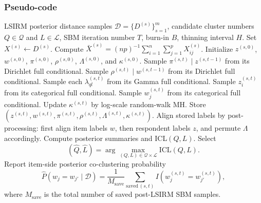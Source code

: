 \documentclass[A4paper,11pt]{article}
\begin{document}
\subsubsection{Pseudo-code}

\begin{algorithm}[H]
\caption{Post-LSIRM bipartite SBM using posterior distance samples}
\begin{algorithmic}[1]
\Require LSIRM posterior distance samples $\mathcal{D}=\{D^{(s)}\}_{s=1}^m$,
candidate cluster numbers $Q \in \mathcal{Q}$ and $L \in \mathcal{L}$,
SBM iteration number $T$, burn-in $B$, thinning interval $H$.
        \State Set $X^{(s)} \leftarrow D^{(s)}$.
        \State Compute $\bar X^{(s)} = (np)^{-1}\sum_{i=1}^n\sum_{j=1}^p X^{(s)}_{ij}$.
        \State Initialize $z^{(s,0)}$, $w^{(s,0)}$, $\pi^{(s,0)}$, $\rho^{(s,0)}$,
        $\Lambda^{(s,0)}$, and $\kappa^{(s,0)}$.
            \State Sample $\pi^{(s,t)} \mid z^{(s,t-1)}$ from its Dirichlet full conditional.
            \State Sample $\rho^{(s,t)} \mid w^{(s,t-1)}$ from its Dirichlet full conditional.
            \State Sample each $\lambda_{ql}^{(s,t)}$ from its Gamma full conditional.
                \State Sample $z_i^{(s,t)}$ from its categorical full conditional.
            \EndFor
                \State Sample $w_j^{(s,t)}$ from its categorical full conditional.
            \EndFor
            \State Update $\kappa^{(s,t)}$ by log-scale random-walk MH.
                \State Store $\left(z^{(s,t)},w^{(s,t)},\pi^{(s,t)},\rho^{(s,t)},\Lambda^{(s,t)},\kappa^{(s,t)}\right)$.
            \EndIf
        \EndFor
    \EndFor
    \State Align stored labels by post-processing:
    first align item labels $w$, then respondent labels $z$, and permute $\Lambda$ accordingly.
    \State Compute posterior summaries and ICL$(Q,L)$.
\EndFor
\State Select
\[
(\widehat Q,\widehat L)
=
\arg\max_{(Q,L)\in\mathcal{Q}\times\mathcal{L}}
\mathrm{ICL}(Q,L).
\]
\State Report item-side posterior co-clustering probability
\[
\widehat P(w_j=w_{j'} \mid \mathcal{D})
=
\frac{1}{M_{\mathrm{save}}}
\sum_{\mathrm{saved}\, (s,t)}
I\left(w_j^{(s,t)}=w_{j'}^{(s,t)}\right),
\]
where $M_{\mathrm{save}}$ is the total number of saved post-LSIRM SBM samples.
\end{algorithmic}
\end{algorithm}
\end{document}
